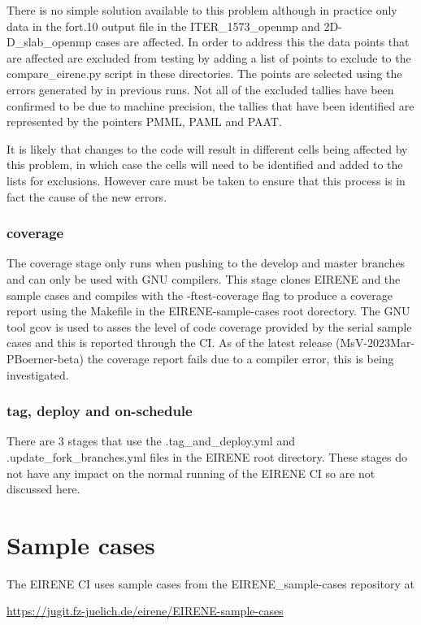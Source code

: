 There is no simple solution available to this problem although in practice only data in the {fort.10} output file in the {ITER\_1573\_openmp} and {2D-D\_slab\_openmp} cases are affected. In order to address this the data points that are affected are excluded from testing by adding a list of points to exclude to the {compare\_eirene.py} script in these directories. The points are selected using the errors generated by in previous runs. Not all of the excluded tallies have been confirmed to be due to machine precision, the tallies that have been identified are represented by the pointers {PMML, PAML} and {PAAT}.

It is likely that changes to the code will result in different cells being affected by this problem, in which case the cells will need to be identified and added to the lists for exclusions. However care must be taken to ensure that this process is in fact the cause of the new errors.

\subsubsection{coverage}
The coverage stage only runs when pushing to the develop and master branches and can only be used with GNU compilers. This stage clones EIRENE and the sample cases and compiles with the -ftest-coverage flag to produce a coverage report using the Makefile in the EIRENE-sample-cases root dorectory. The GNU tool gcov is used to asses the level of code coverage provided by the serial sample cases and this is reported through the CI. As of the latest release (MsV-2023Mar-PBoerner-beta) the coverage report fails due to a compiler error, this is being investigated.

\subsubsection{tag, deploy and on-schedule}
There are 3 stages that use the {.tag\_and\_deploy.yml} and {.update\_fork\_branches.yml} files in the EIRENE root directory. These stages do not have any impact on the normal running of the EIRENE CI so are not discussed here.


\section{Sample cases}
\label{loc:sampleCases}
The EIRENE CI uses sample cases from the {EIRENE\_sample-cases} repository at

\url{https://jugit.fz-juelich.de/eirene/EIRENE-sample-cases}

